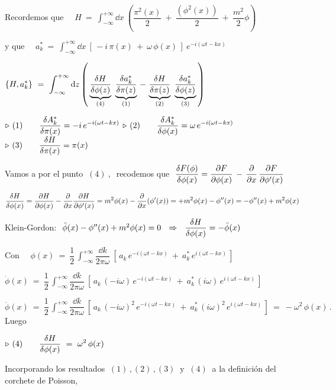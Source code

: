 \color{MidnightBlue}

Recordemos que $\quad \displaystyle H \ = \  \int_{-\infty}^{+\infty} \dd x \ \left( \dfrac{\pi^2(x)}{2} \ + \ \dfrac{(\phi^2(x))}{2} \ + \ \dfrac{m^2}{2}\phi \right) $

y que $\quad a^*_k \ = \displaystyle \ \int_{-\infty}^{+\infty} \dd x\ \left[\, -i\, \pi(x) \ + \ \omega\, \phi(x) \, \right] \ e^{-i(\omega t-kx)}$

$\displaystyle \{H,a^*_k\} \ = \  \int_{-\infty}^{+\infty} \dd z \left( \, \underbrace{\fdv{H}{\phi(z)}}_{(4)} \ \underbrace{\fdv{a^*_k}{\pi(z)}}_{(1)} \, - \, \underbrace{\fdv {H}{\pi(z)}}_{(2)} \ \underbrace{\fdv{a^*_k}{\phi(z)}}_{(3)} \, \right) $

$\triangleright \ (1) \qquad \displaystyle \fdv{A^*_k}{\pi(x)}=-i\, e^{-i(\omega t - kx)}$
\hspace{1cm}
$\triangleright \ (2) \qquad \displaystyle \fdv{A^*_k}{\phi(x)}= \omega\, e^{-i(\omega t - kx)}$
\hspace{1cm}
$\triangleright \ (3) \qquad \displaystyle \fdv{H}{\pi(x)}=\pi(x)$

Vamos a por el punto $ \ (4) \ , \ $ recodemos que $\ \displaystyle \fdv{F(\phi)}{\phi(x)} = \pdv{F}{\phi(x)} \, - \, \pdv{x}\, \pdv{F}{\phi'(x)} $

$\displaystyle \fdv{H}{\phi(x)}= \pdv{H}{\phi(x)}-\pdv{x} \pdv{H}{\phi'(x)} = m^2\phi(x)-\pdv{x}(\phi'(x))= +m^2\phi(x)-\phi''(x)=   -\phi''(x)+m^2\phi(x)\ $

 Klein-Gordon: $\ \ddot \phi(x)-\phi''(x)+m^2\phi(x)=0 \ \ \Rightarrow \ \ \displaystyle \fdv{H}{\phi(x)}=-\ddot \phi(x)$

Con $\quad \displaystyle \phi(x)\ = \ \dfrac 1 2\,  \int_{-\infty}^{+\infty} \dfrac{\dd k}{2\pi \omega} \ \left[ \, a_k\, e^{-i(\omega t-kx)}\ + \ a^*_k\, e^{i(\omega t -kx)} \, \right]$


$\dot \phi(x) \ = \ \dfrac 1 2\,  \int_{-\infty}^{+\infty} \dfrac{\dd k}{2\pi \omega} \ \left[ \, a_k\, (-i\omega)\, e^{-i(\omega t-kx)}\ + \ a^*_k\, (i\omega)\, e^{i(\omega t -kx)} \, \right]$

$\ddot \phi(x) \ = \ \dfrac 1 2\,  \int_{-\infty}^{+\infty} \dfrac{\dd k}{2\pi \omega} \ \left[ \, a_k\, (-i\omega)^2\, e^{-i(\omega t-kx)}\ + \ a^*_k\, (i\omega)^2\, e^{i(\omega t -kx)} \, \right] \ = \ -\omega^2\, \phi(x) \, . \ $ Luego

$\triangleright \ (4) \qquad \displaystyle \fdv{H}{\phi(x)}\ = \ \omega^2\, \phi(x)$

Incorporando los resultados $\ (1)\, , (2)\, , (3)\ \text{ y } \ (4) \ $ a la definición del corchete de Poisson,

